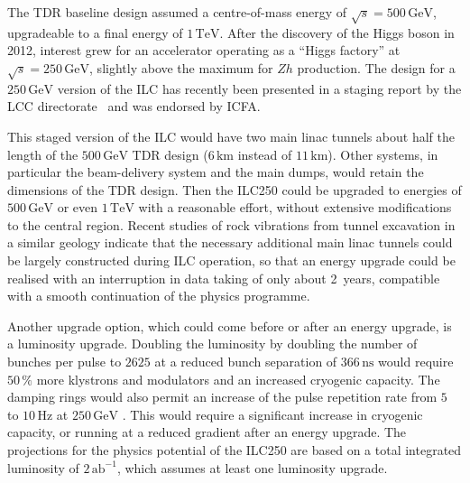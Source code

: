 \documentclass[%
reprint,
 floatfix,
 amsmath,amssymb,
 aps,
]{revtex4-1}
\begin{document}
The TDR baseline design assumed
 a centre-of-mass energy of $\sqrt{s}=500\,{\mathrm{GeV}}$, upgradeable to a final energy of $1\,{\mathrm{TeV}}$.
After the discovery of the Higgs boson in 2012, interest 
grew for an accelerator operating as a ``Higgs factory'' at
 $\sqrt{s}=250\,{\mathrm{GeV}}$, slightly above the maximum for $Zh$ production. 
The design for a $250\,{\mathrm{GeV}}$ version of the 
ILC has recently been presented in a  staging
 report by the LCC directorate~\cite{Evans:2017rvt} and was endorsed by ICFA.

This staged version of the ILC  
would have two main linac tunnels about half the length of the
$500\,{\mathrm{GeV}}$ TDR design    ($6\,{\mathrm{km}}$  instead of $11\,{\mathrm{km}}$).
Other systems, in particular the beam-delivery system and the 
main dumps, would retain the dimensions of the TDR design.
Then the ILC250 could be upgraded to energies of $500\,{\mathrm{GeV}}$
or even $1\,{\mathrm{TeV}}$ with a reasonable effort, without
extensive
 modifications to the central region. 
Recent studies of rock vibrations from tunnel excavation in a similar
geology indicate that the necessary additional main linac tunnels
could be largely constructed during ILC operation, so that an energy
upgrade could be realised with an interruption in data taking of only
about 2~years, 
compatible with a smooth 
continuation of the physics programme.

Another upgrade option, which could come before or after an energy upgrade, is a luminosity upgrade. 
Doubling the luminosity by doubling the number of bunches per pulse to $2625$ at a reduced bunch separation of $366\,{\mathrm{ns}}$ would require $50\,\%$ more klystrons and modulators and an increased cryogenic capacity. 
The damping rings would also permit an increase of the pulse
 repetition rate from $5$ to $10\,{\mathrm{Hz}}$ at $250\,{\mathrm{GeV}}$ .  
This would require a significant increase in cryogenic capacity, 
or running at a reduced gradient after an energy upgrade.
The projections for the physics potential 
of the ILC250 are based on a total integrated 
luminosity of $2\,{\mathrm{ab}}^{-1}$, which assumes at least one luminosity upgrade.

\end{document}
